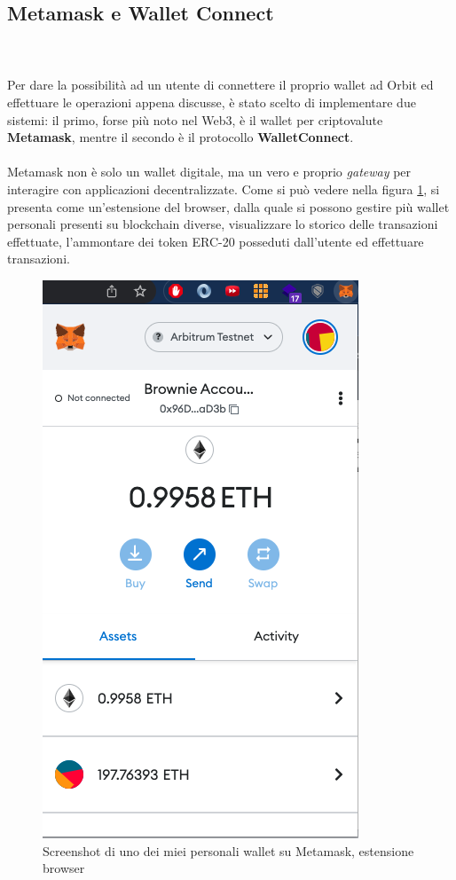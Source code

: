 \documentclass[12pt,a4paper]{report}
\begin{document}
\subsection{Metamask e Wallet Connect}
\\\\Per dare la possibilità ad un utente di connettere il proprio wallet ad Orbit ed effettuare le operazioni appena discusse, è stato scelto di implementare due sistemi: il primo, forse più noto nel Web3, è il wallet per criptovalute \textbf{Metamask}\cite{metamask}, mentre il secondo è il protocollo \textbf{WalletConnect}\cite{walletconnect}.
\\\\Metamask non è solo un wallet digitale, ma un vero e proprio \textit{gateway} per interagire con applicazioni decentralizzate. Come si può vedere nella figura \ref{fig:metamask}, si presenta come un'estensione del browser, dalla quale si possono gestire più wallet personali presenti su blockchain diverse, visualizzare lo storico delle transazioni effettuate, l'ammontare dei token ERC-20 posseduti dall'utente ed effettuare transazioni.\\
\begin{figure}[H]
  \includegraphics[scale=0.6]{metamask.png}
  \centering
  \caption{Screenshot di uno dei miei personali wallet su Metamask, estensione browser}
  \label{fig:metamask}
\end{figure}
\end{document}
